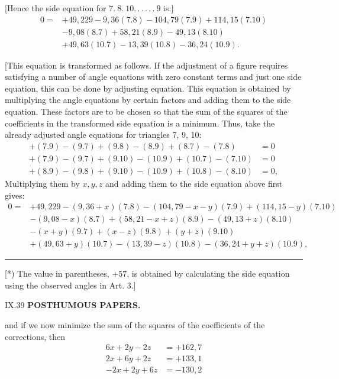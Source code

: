[Hence the side equation for $7.\ 8.\ 10.\,.\,.\,.\,.\,.\ 9$ is:]
\[
\begin{aligned}
0={}&+49{,}229-9{,}36(7.8)-104{,}79(7.9)+114{,}15(7.10)\\
&-9{,}08(8.7)+58{,}21(8.9)-49{,}13(8.10)\\
&+49{,}63(10.7)-13{,}39(10.8)-36{,}24(10.9).
\end{aligned}
\]

[This equation is transformed as follows. If the adjustment
of a figure requires satisfying a number of angle equations with zero constant
terms and just one side equation, this can be done by adjusting
 equation. This equation is obtained by multiplying
the angle equations by certain factors
and adding them to the side equation. These factors are to be chosen
so that the sum of the squares of the coefficients in the transformed
side equation is a minimum. Thus, take the already adjusted angle equations
for triangles 7, 9, 10:
\[
\begin{aligned}
+(7.9)-(9.7)+(9.8)-(8.9)+(8.7)-(7.8)&=0\\
+(7.9)-(9.7)+(9.10)-(10.9)+(10.7)-(7.10)&=0\\
+(8.9)-(9.8)+(9.10)-(10.9)+(10.8)-(8.10)&=0,
\end{aligned}
\]
Multiplying them by $x,y,z$ and adding them to the side equation above
first gives:
\[
\begin{aligned}
0={}&+49{,}229-(9{,}36+x)(7.8)-(104{,}79-x-y)(7.9)+(114{,}15-y)(7.10)\\
&-(9{,}08-x)(8.7)+(58{,}21-x+z)(8.9)-(49{,}13+z)(8.10)\\
&-(x+y)(9.7)+(x-z)(9.8)+(y+z)(9.10)\\
&+(49{,}63+y)(10.7)-(13{,}39-z)(10.8)-(36{,}24+y+z)(10.9),
\end{aligned}
\]
\par\smallskip
\noindent\rule{0.25\textwidth}{0.4pt}\par
{\footnotesize
[*) The value in parentheses, $+57$, is obtained by calculating the side equation using
the observed angles in Art. 3.]\par}
\vfill
\noindent\textsc{IX.}\hfill39
\newpage
{}\hfill\textbf{POSTHUMOUS PAPERS.}\par\medskip
\noindent and if we now minimize the sum of the squares of the coefficients
of the corrections, then
\[
\begin{aligned}
6x+2y-2z&=+162{,}7\\
2x+6y+2z&=+133{,}1\\
-2x+2y+6z&=-130{,}2
\end{aligned}
\]
